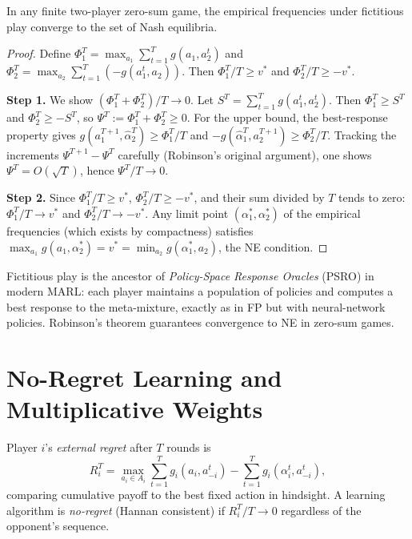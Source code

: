 \documentclass[11pt,a4paper]{article}
\begin{document}
\begin{keyresult}[title={Robinson's Theorem}]
\begin{theorem}
\label{thm:robinson}
In any finite two-player zero-sum game, the empirical frequencies under
fictitious play converge to the set of Nash equilibria.
\end{theorem}
\end{keyresult}

\begin{proof}
Define $\Phi_1^T = \max_{a_1}\sum_{t=1}^T g(a_1, a_2^t)$ and
$\Phi_2^T = \max_{a_2}\sum_{t=1}^T(-g(a_1^t, a_2))$.
Then $\Phi_1^T/T \geq v^*$ and $\Phi_2^T/T \geq -v^*$.

\textbf{Step 1.} We show $(\Phi_1^T + \Phi_2^T)/T \to 0$.
Let $S^T = \sum_{t=1}^T g(a_1^t, a_2^t)$. Then
$\Phi_1^T \geq S^T$ and $\Phi_2^T \geq -S^T$, so
$\Psi^T := \Phi_1^T + \Phi_2^T \geq 0$. For the upper bound, the
best-response property gives
$g(a_1^{T+1}, \hat{\alpha}_2^T) \geq \Phi_1^T/T$ and
$-g(\hat{\alpha}_1^T, a_2^{T+1}) \geq \Phi_2^T/T$. Tracking the
increments $\Psi^{T+1} - \Psi^T$ carefully (Robinson's original
argument), one shows $\Psi^T = O(\sqrt{T})$, hence $\Psi^T/T \to 0$.

\textbf{Step 2.} Since $\Phi_1^T/T \geq v^*$, $\Phi_2^T/T \geq -v^*$,
and their sum divided by $T$ tends to zero:
$\Phi_1^T/T \to v^*$ and $\Phi_2^T/T \to -v^*$.
Any limit point $(\alpha_1^*, \alpha_2^*)$ of the empirical frequencies
(which exists by compactness) satisfies
$\max_{a_1}g(a_1, \alpha_2^*) = v^* = \min_{a_2}g(\alpha_1^*, a_2)$,
the NE condition.
\end{proof}

\begin{rlconnection}[title={Fictitious Play and PSRO}]
Fictitious play is the ancestor of \emph{Policy-Space Response Oracles}
(PSRO) in modern MARL: each player maintains a population of policies
and computes a best response to the meta-mixture, exactly as in FP but
with neural-network policies. Robinson's theorem guarantees convergence
to NE in zero-sum games.
\end{rlconnection}


\section{No-Regret Learning and Multiplicative Weights}
\label{sec:no-regret}

\begin{definition}
\label{def:external-regret}
Player $i$'s \emph{external regret} after $T$ rounds is
\[
    R_i^T = \max_{a_i \in A_i} \sum_{t=1}^T g_i(a_i, a_{-i}^t)
    - \sum_{t=1}^T g_i(\alpha_i^t, a_{-i}^t),
\]
comparing cumulative payoff to the best fixed action in hindsight.
A learning algorithm is \emph{no-regret} (Hannan consistent) if
$R_i^T/T \to 0$ regardless of the opponent's sequence.
\end{definition}
\end{document}

